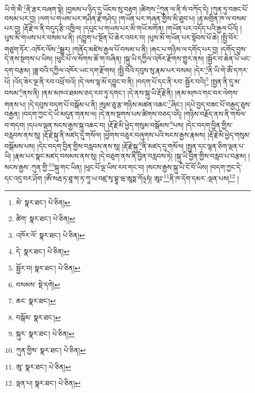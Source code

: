 ཡི་གེ་མཻ་\footnote{མེ་  སྣར་ཐང་།  པེ་ཅིན། }ནི་རྩར་བཞག་སྟེ། །བྱམས་པ་ཉིད་དུ་ཡོངས་སུ་བརྟག །ཚིགས་\footnote{ཚིག་  སྣར་ཐང་།  པེ་ཅིན། }ཀུན་ལ་ནི་སཾ་བཀོད་དེ། །ཀུན་ཏུ་བཟང་པོ་བསམ་པར་བྱ། །ལག་པ་གཡས་པར་གཤིན་རྗེ་གཤེད། །གཡོན་པར་གཞན་གྱིས་མི་ཐུབ་པ། །རྟ་མགྲིན་ཁ་ལ་བསམ་པར་བྱ། །རྡོ་རྗེ་ལ་ནི་བདུད་རྩི་འཁྱིལ། །དཔུང་པ་གཡས་པར་མི་གཡོ་མགོན། །གཡོན་པར་འདོད་པའི་རྒྱལ་པོའོ། །པུས་མོ་གཡས་པར་བསམ་པ་ནི། །དབྱུག་པ་སྔོན་པོ་ཆེར་འབར་བ། །པུས་མོ་གཡོན་པར་སྟོབས་པོ་ཆེ། །སྤྱི་བོར་གཙུག་ཏོར་:འཁོར་ལོས་\footnote{འཁོར་ལོ་  སྣར་ཐང་།  པེ་ཅིན། }སྒྱུར། །གནོད་མཛེས་རྒྱལ་པོ་བསམ་པ་ནི། །རྐང་པ་གཉིས་ལ་དགོད་པར་བྱ། །དགོད་བྱས་དེ་ནས་སྔགས་པ་ཡིས། །ཕུང་པོ་ལ་སོགས་ཆོ་ག་བཞིན། །སྐུ་ཡི་དཀྱིལ་འཁོར་རྫོགས་གྱུར་ནས། །སྦྱོར་བ་ཆེན་པོ་ཡང་དག་བརྩམ། །ཟླ་བའི་དཀྱིལ་འཁོར་ཡང་དག་རྫོགས། །སྤྱི་བོའི་དབུས་སུ་རྣམ་པར་བསམ། །དེར་\footnote{དེ་  སྣར་ཐང་།  པེ་ཅིན། }ནི་ཡི་གེ་ཨོཾ་དཀར་པོ། །འོད་ཟེར་ལྔ་ནི་རབ་འཕྲོ་བའོ། །དེ་ལས་ལྷ་མོ་དབྱུང་བ་ནི། །བདག་པོ་དང་ནི་རབ་:སྦྱོར་བའི།\footnote{སྦྱོར་བ།  སྣར་ཐང་།  པེ་ཅིན། } །སྤྱན་ནི་དུ་མ་བསམ་\footnote{བསམས་  སྡེ་དགེ། }ནས་ནི། །ནམ་མཁའ་ཐམས་ཅད་རབ་ཏུ་དགང་། །དེ་ནས་སྐུ་ཡི་རྡོ་རྗེ་ནི། །ནམ་མཁའ་གང་བར་ལེགས་གནས་པ། །དེ་དབུས་བདག་པོ་བསྒོམ་པ་ནི། །སུམ་ཅུ་རྩ་གཉིས་མཚན་འཆང་\footnote{ཆང་  སྣར་ཐང་། }ཞིང་། །དཔེ་བྱད་བཟང་པོ་བརྒྱད་ཅུས་བརྒྱན། །བདག་ཀྱང་དེ་ཡི་མདུན་གནས་ལ། །དེ་ནས་སྔགས་པས་ཚིགས་བཅད་འདི། །གཉིས་བརྗོད་ནས་ནི་གསོལ་བ་གདབ། །དཔལ་ལྡན་སངས་རྒྱས་སྐུ་འཆང་བ། །རྡོ་རྗེ་མི་ཕྱེད་གསུམ་བསྒོམས་\footnote{བསྒོམ་  སྣར་ཐང་། }པས། །དེང་བདག་བྱིན་གྱིས་བརླབས་ནས་སུ། །རྡོ་རྗེ་སྐུ་ནི་མཛད་དུ་གསོལ། །ཕྱོགས་བཅུར་བཞུགས་པའི་སངས་རྒྱས་རྣམས། །རྡོ་རྗེ་མི་ཕྱེད་གསུམ་བསྒོམས་པས། །དེང་བདག་བྱིན་གྱིས་བརླབས་ནས་སུ། །རྡོ་རྗེ་སྐུ་\footnote{སྐུར་  སྣར་ཐང་།  པེ་ཅིན། }ནི་མཛད་དུ་གསོལ། །སྤྱན་དང་ལྷན་ཅིག་ལྡན་པ་ཡི། །རྣམ་པར་སྣང་མཛད་བསམས་ནས་སུ། །དེ་བཅུག་ནས་ནི་བྱིན་བརླབས་ཏེ། །སྐུ་ཡི་བྱིན་གྱིས་བརླབ་པ་བརྩམ། །སངས་རྒྱས་:ཀུན་གྱི་\footnote{ཀུན་གྱིས་  སྣར་ཐང་།  པེ་ཅིན། }སྐུ་གང་ཡིན། །ཕུང་པོ་ལྔ་ཡིས་རབ་གང་བ། །སངས་རྒྱས་སྐུ་ཡི་ངོ་བོ་ཡིས། །བདག་ཀྱང་དེ་དང་འདྲ་བར་ཤོག །ཨོཾ་སརྦ་ཏ་ཐཱ་ག་ཏ་ཀཱ་ཡ་བཛྲ་སྭ་བྷཱ་ཝ་ཨཱཏྨ་ཀོ྅ཧཾ། ཨཱཿ་\footnote{ཨཱ་  སྣར་ཐང་།  པེ་ཅིན། }ནི་ཁ་དོག་དམར་:ལྡན་པས།\footnote{ལྡན་པ།  སྣར་ཐང་།  པེ་ཅིན། } །
